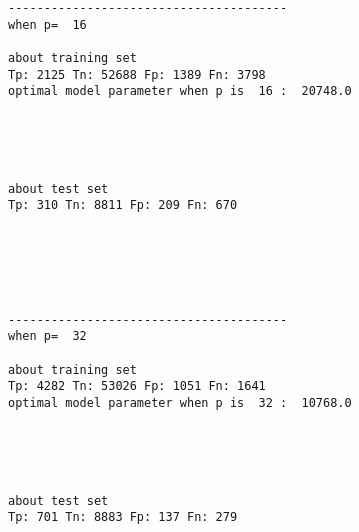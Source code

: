 \documentclass[11pt]{article}
\begin{document}
    \begin{Verbatim}[commandchars=\\\{\}]



---------------------------------------
when p=  16

about training set
Tp: 2125 Tn: 52688 Fp: 1389 Fn: 3798
optimal model parameter when p is  16 :  20748.0

    \end{Verbatim}

    \begin{center}
    \end{center}
    { \hspace*{\fill} \\}
    
    \begin{Verbatim}[commandchars=\\\{\}]


about test set
Tp: 310 Tn: 8811 Fp: 209 Fn: 670

    \end{Verbatim}

    \begin{center}
    \end{center}
    { \hspace*{\fill} \\}
    
    \begin{Verbatim}[commandchars=\\\{\}]



---------------------------------------
when p=  32

about training set
Tp: 4282 Tn: 53026 Fp: 1051 Fn: 1641
optimal model parameter when p is  32 :  10768.0

    \end{Verbatim}

    \begin{center}
    \end{center}
    { \hspace*{\fill} \\}
    
    \begin{Verbatim}[commandchars=\\\{\}]


about test set
Tp: 701 Tn: 8883 Fp: 137 Fn: 279

    \end{Verbatim}
\end{document}
